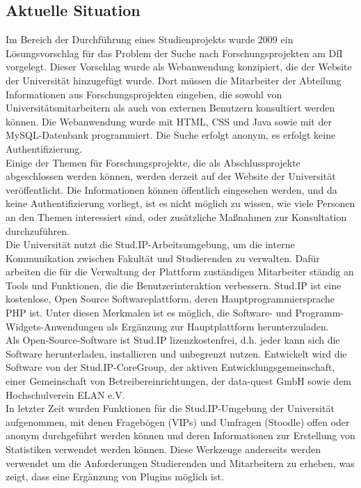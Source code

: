 \subsection{Aktuelle Situation}
Im Bereich der Durchführung eines Studienprojekts wurde 2009\cite{Watat:2019} ein Lösungsvorschlag für das Problem der Suche nach Forschungsprojekten am DfI vorgelegt. Dieser Vorschlag wurde als Webanwendung konzipiert, die der Website der Universität hinzugefügt wurde. Dort müssen die Mitarbeiter der Abteilung Informationen aus Forschungsprojekten eingeben, die sowohl von Universitätsmitarbeitern als auch von externen Benutzern konsultiert werden können.
Die Webanwendung wurde mit HTML, CSS und Java sowie mit der MySQL-Datenbank programmiert. Die Suche erfolgt anonym, es erfolgt keine Authentifizierung.\\

Einige der Themen für Forschungsprojekte, die als Abschlussprojekte abgeschlossen werden können, werden derzeit auf der Website der Universität veröffentlicht. Die Informationen können öffentlich eingesehen werden, und da keine Authentifizierung vorliegt, ist es nicht möglich zu wissen, wie viele Personen an den Themen interessiert sind, oder zusätzliche Ma{\ss}nahmen zur Konsultation durchzuführen.\\

Die Universität nutzt die Stud.IP-Arbeitsumgebung, um die interne Kommunikation zwischen Fakultät und Studierenden zu verwalten. Dafür arbeiten die für die Verwaltung der Plattform zuständigen Mitarbeiter ständig an Tools und Funktionen, die die Benutzerinteraktion verbessern.
Stud.IP ist eine kostenlose, Open Source Softwareplattform, deren Hauptprogrammiersprache PHP ist\cite{SIPPHP:2020}. Unter diesen Merkmalen ist es möglich, die Software- und Programm-Widgets-Anwendungen als Ergänzung zur Hauptplattform herunterzuladen.\\
Als Open-Source-Software ist Stud.IP lizenzkostenfrei\cite{SIPOS:2020}, d.h. jeder kann sich die Software herunterladen, installieren und unbegrenzt nutzen. Entwickelt wird die Software von der Stud.IP-CoreGroup, der aktiven Entwicklungsgemeinschaft, einer Gemeinschaft von Betreibereinrichtungen, der data-quest GmbH sowie dem Hochschulverein ELAN e.V.\\

In letzter Zeit wurden Funktionen für die Stud.IP-Umgebung der Universität aufgenommen, mit denen Fragebögen (VIPs) und Umfragen (Stoodle) offen oder anonym durchgeführt werden können und deren Informationen zur Erstellung von Statistiken verwendet werden können. Diese Werkzeuge anderseits werden verwendet um die Anforderungen Studierenden und Mitarbeitern zu erheben, was zeigt, dass eine Ergänzung von Plugins möglich ist.